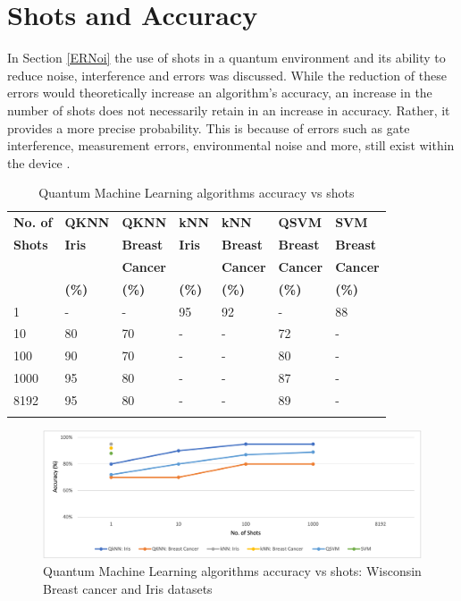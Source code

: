 \section{Shots and Accuracy}

In Section \ref{ERNoi} the use of shots in a quantum environment and its ability to reduce noise, interference and errors was discussed. While the reduction of these errors would theoretically increase an algorithm's accuracy, an increase in the number of shots does not necessarily retain in an increase in accuracy. Rather, it provides a more precise probability. This is because of errors such as gate interference, measurement errors, environmental noise and more, still exist within the device \citep{QiskitShots}. 



\begin{table}[H]
\caption{Quantum Machine Learning algorithms accuracy vs shots}
\label{tab:treatments}
\centering
\begin{tabular}{l l l l l l l}
\toprule
\textbf{No. of} & \textbf{QKNN} & \textbf{QKNN} & \textbf{kNN}& \textbf{kNN} & \textbf{QSVM} & \textbf{SVM}\\
\textbf{Shots} & \textbf{Iris} & \textbf{Breast}& \textbf{Iris} & \textbf{Breast} & \textbf{Breast}& \textbf{Breast}\\
\textbf{} & \textbf{} & \textbf{Cancer}& \textbf{} & \textbf{Cancer} & \textbf{Cancer}& \textbf{Cancer}\\
\textbf{} & \textbf{(\%)} & \textbf{(\%)}& \textbf{(\%)} & \textbf{(\%)} & \textbf{(\%)}& \textbf{(\%)}\\
\midrule
1 & - & - & 95 & 92 & - & 88\\
10 & 80 & 70& - & - & 72 & - \\
100 & 90 & 70 & - & - & 80 & -\\
1000 & 95 & 80& - & - & 87 & -\\
8192 & 95 & 80 & - & - & 89 & -\\
\bottomrule\\
\end{tabular}
\normalsize
\end{table}

\begin{figure}[H]
      \centering
      \includegraphics[scale=0.7]{background/accuracy.png}
      \caption{Quantum Machine Learning algorithms accuracy vs shots: Wisconsin Breast cancer and Iris datasets}
      \label{Accuracy}
\end{figure}

